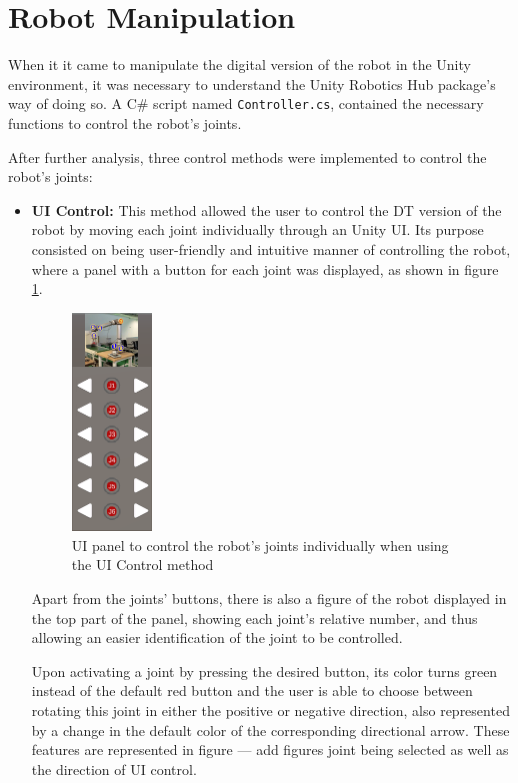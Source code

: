     

    \section{Robot Manipulation}
When it it came to manipulate the digital version of the robot in the Unity environment, it was necessary to understand the Unity Robotics Hub package's way of doing so. A C\# script named \texttt{Controller.cs}, contained the necessary functions to control the robot's joints.


After further analysis, three control methods were implemented to control the robot's joints:
\begin{itemize}
    \item \textbf{UI Control:} This method allowed the user to control the \ac{DT} version of the robot by moving each joint individually through an Unity \ac{UI}. Its purpose consisted on being user-friendly and intuitive manner of controlling the robot, where a panel with a button for each joint was displayed, as shown in figure \ref{f:ui-control}. 
    
    \begin{figure}[h]
        \centering
        \includegraphics[width=0.2\textwidth]{figs/toggle-1.png}
        \caption{\ac{UI} panel to control the robot's joints individually when using the \ac{UI} Control method}
        \label{f:ui-control}
    \end{figure}
    \FloatBarrier

    Apart from the joints' buttons, there is also a figure of the robot displayed in the top part of the panel, showing each joint's relative number, and thus allowing an easier identification of the joint to be controlled.
    
    Upon activating a joint by pressing the desired button, its color turns green instead of the default red button and the user is able to choose between rotating this joint in either the positive or negative direction, also represented by a change in the default color of the corresponding directional arrow. These features are represented in figure --- add figures joint being selected as well as the direction of UI control.
    

\end{itemize}

